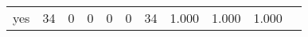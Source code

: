 \begin{longtable}{lp{1.10cm}p{1.10cm}p{1.10cm}p{1.10cm}p{1.10cm}p{1.10cm}p{1.10cm}p{1.10cm}p{1.10cm}p{1.10cm}}
yes       &                     34 &                                  0 &                                 0 &                                0 &                                 0 &                              34 &                          1.000 &                                 1.000 &                               1.000 \\
\end{longtable}
